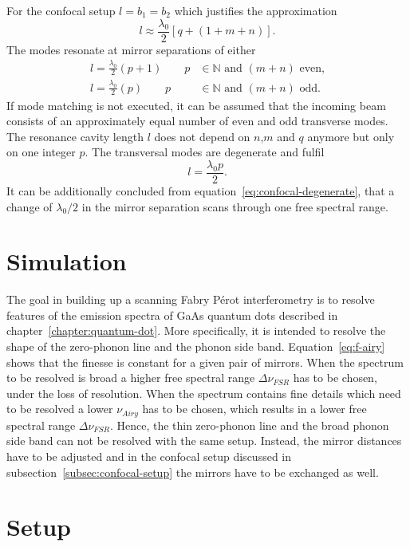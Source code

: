 For the confocal setup $l=b_1=b_2$ which justifies the approximation
\begin{equation}
l \approx \frac{\lambda_0}{2} \left[q + \left(1+m+n\right)\right].
\end{equation}
The modes resonate at mirror separations of either
\begin{align}
l = \frac{\lambda_0}{2}(p+1) \qquad p&\in\mathbb{N} \textrm{ and } (m+n) \textrm{ even,} \\
l = \frac{\lambda_0}{2}(p) \qquad p&\in\mathbb{N} \textrm{ and } (m+n) \textrm{ odd.}
\end{align}
If mode matching is not executed, it can be assumed that the incoming beam consists of an approximately equal number of even and odd transverse modes.
The resonance cavity length $l$ does not depend on $n$,$m$ and $q$ anymore but only on one integer $p$. The transversal modes are degenerate and fulfil
\begin{equation}
\label{eq:confocal-degenerate}
l = \frac{\lambda_0 p}{2}.	
\end{equation}
It can be additionally concluded from equation~\eqref{eq:confocal-degenerate}, that a change of $\lambda_0/2$ in the mirror separation scans through one free spectral range.
\section{Simulation}

The goal in building up a scanning Fabry Pérot interferometry is to resolve features of the emission spectra of GaAs quantum dots described in chapter~\ref{chapter:quantum-dot}. More specifically, it is intended to resolve the shape of the zero-phonon line and the phonon side band.
Equation~\ref{eq:f-airy} shows that the finesse is constant for a given pair of mirrors.
When the spectrum to be resolved is broad a higher free spectral range $\Delta \nu_{FSR}$ has to be chosen, under the loss of resolution.
When the spectrum contains fine details which need to be resolved a lower $\nu_{Airy}$ has to be chosen, which results in a lower free spectral range $\Delta \nu_{FSR}$.
Hence, the thin zero-phonon line and the broad phonon side band can not be resolved with the same setup.
Instead, the mirror distances have to be adjusted and in the confocal setup discussed in subsection~\ref{subsec:confocal-setup} the mirrors have to be exchanged as well.



\section{Setup}


